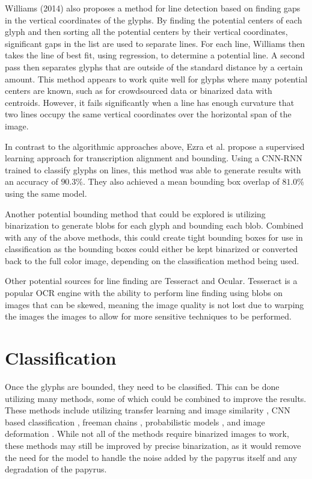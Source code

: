 Williams (2014)\cite{Williams2014} also proposes a method for line detection based on finding gaps in the vertical coordinates of the glyphs. By finding the potential centers of each glyph and then sorting all the potential centers by their vertical coordinates, significant gaps in the list are used to separate lines. For each line, Williams then takes the line of best fit, using regression, to determine a potential line. A second pass then separates glyphs that are outside of the standard distance by a certain amount. This method appears to work quite well for glyphs where many potential centers are known, such as for crowdsourced data or binarized data with centroids. However, it fails significantly when a line has enough curvature that two lines occupy the same vertical coordinates over the horizontal span of the image.

In contrast to the algorithmic approaches above, Ezra et al.\cite{Ezra} propose a supervised learning approach for transcription alignment and bounding. Using a CNN-RNN trained to classify glyphs on lines, this method was able to generate results with an accuracy of $90.3\%$. They also achieved a mean bounding box overlap of $81.0\%$ using the same model.

Another potential bounding method that could be explored is utilizing binarization to generate blobs for each glyph and bounding each blob. Combined with any of the above methods, this could create tight bounding boxes for use in classification as the bounding boxes could either be kept binarized or converted back to the full color image, depending on the classification method being used.

Other potential sources for line finding are Tesseract\cite{SmithTesseract} and Ocular\cite{Berg-Kirkpatrick}. Tesseract is a popular OCR engine with the ability to perform line finding \cite{SmithLines} using blobs on images that can be skewed, meaning the image quality is not lost due to warping the images the images to allow for more sensitive techniques to be performed.

\section{Classification}
Once the glyphs are bounded, they need to be classified. This can be done utilizing many methods, some of which could be combined to improve the results.
These methods include utilizing transfer learning and image similarity \cite{Vadicamo, Yuan}, CNN based classification \cite{Yousefi, Haliassos, Swindall}, freeman chains \cite{Althobaiti}, probabilistic models \cite{Berg-Kirkpatrick}, and image deformation \cite{Nederhof, Keysers, Tabin, Gass}. While not all of the methods require binarized images to work, these methods may still be improved by precise binarization, as it would remove the need for the model to handle the noise added by the papyrus itself and any degradation of the papyrus.

